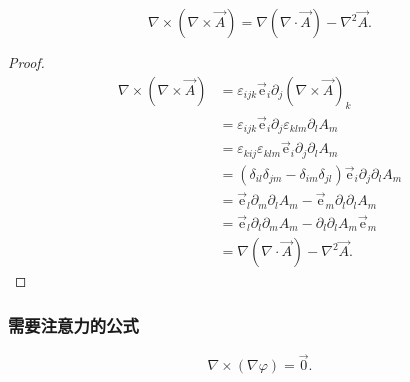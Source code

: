 \begin{example}
\begin{equation}
\nabla\times\left(\nabla\times\vec{A}\right)
=\nabla\left(\nabla\cdot\vec{A}\right)-\nabla^2 \vec{A}.
\end{equation}
\end{example}

\begin{proof}
\begin{equation}
\begin{split}
\nabla\times\left(\nabla\times\vec{A}\right)
&=\varepsilon_{ijk} \vec{\mathrm{e}}_i\partial_j \left(\nabla\times\vec{A}\right)_k \\
&=\varepsilon_{ijk} \vec{\mathrm{e}}_i \partial_j \varepsilon_{klm} \partial_l A_m \\
&=\varepsilon_{kij}\varepsilon_{klm} \vec{\mathrm{e}}_i\partial_j\partial_l A_m \\
&=(\delta_{il}\delta_{jm}-\delta_{im}\delta_{jl}) \vec{\mathrm{e}}_i \partial_j \partial_l A_m \\
&=\vec{\mathrm{e}}_l\partial_m \partial_l A_m - \vec{\mathrm{e}}_m\partial_l \partial_l A_m \\
&=\vec{\mathrm{e}}_l\partial_l\partial_m A_m -\partial_l\partial_l A_m\vec{\mathrm{e}}_m \\
&=\nabla\left(\nabla\cdot\vec{A}\right) - \nabla^2\vec{A}.
\end{split}
\end{equation}
\end{proof}

\subsubsection{需要注意力的公式}

\begin{example}
\begin{equation}
\nabla\times(\nabla \varphi)
=\vec{0}.
\end{equation}
\end{example}

